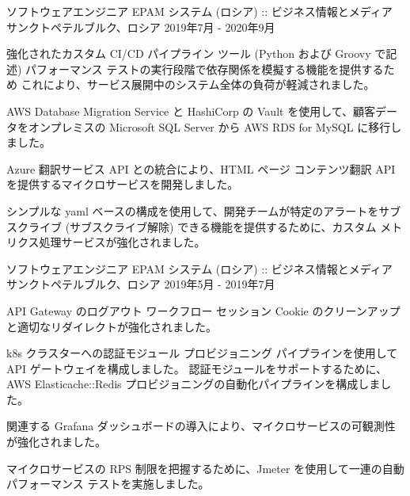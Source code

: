 \begin{cventries}
\cventry
{ソフトウェアエンジニア} %
{EPAM システム (ロシア) :: ビジネス情報とメディア} %
{サンクトペテルブルク、ロシア} %
{2019年7月 - 2020年9月} %
{
  \begin{cvitems} %
    \item {強化されたカスタム CI/CD パイプライン ツール (Python および Groovy で記述)
    パフォーマンス テストの実行段階で依存関係を模擬する機能を提供するため
     これにより、サービス展開中のシステム全体の負荷が軽減されました。}
    \item {AWS Database Migration Service と HashiCorp の Vault を使用して、顧客データをオンプレミスの Microsoft SQL Server から AWS RDS for MySQL に移行しました。}
    \item {Azure 翻訳サービス API との統合により、HTML ページ コンテンツ翻訳 API を提供するマイクロサービスを開発しました。}
    \item {シンプルな yaml ベースの構成を使用して、開発チームが特定のアラートをサブスクライブ (サブスクライブ解除) できる機能を提供するために、カスタム メトリクス処理サービスが強化されました。}
  \end{cvitems}
}

\cventry
{ソフトウェアエンジニア} %
{EPAM システム (ロシア) :: ビジネス情報とメディア} %
{サンクトペテルブルク、ロシア} %
{2019年5月 - 2019年7月} %
{
  \begin{cvitems} %
    \item {API Gateway のログアウト ワークフロー セッション Cookie のクリーンアップと適切なリダイレクトが強化されました。}
    \item {k8s クラスターへの認証モジュール プロビジョニング パイプラインを使用して API ゲートウェイを構成しました。
    認証モジュールをサポートするために、AWS Elasticache::Redis プロビジョニングの自動化パイプラインを構成しました。}
    \item {関連する Grafana ダッシュボードの導入により、マイクロサービスの可観測性が強化されました。}
    \item {マイクロサービスの RPS 制限を把握するために、Jmeter を使用して一連の自動パフォーマンス テストを実施しました。}
  \end{cvitems}
}


\end{cventries}
